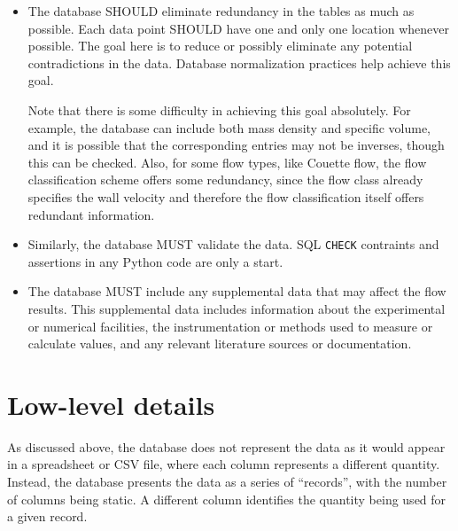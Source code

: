 \begin{itemize}
\begin{enumerate}
    \end{enumerate}

\item The database SHOULD eliminate redundancy in the tables as much as
possible.  Each data point SHOULD have one and only one location whenever
possible.  The goal here is to reduce or possibly eliminate any potential
contradictions in the data.  Database normalization practices help achieve this
goal.

Note that there is some difficulty in achieving this goal absolutely.  For
example, the database can include both mass density and specific volume, and it
is possible that the corresponding entries may not be inverses, though this can
be checked.  Also, for some flow types, like Couette flow, the flow
classification scheme offers some redundancy, since the flow class already
specifies the wall velocity and therefore the flow classification itself offers
redundant information.

\item Similarly, the database MUST validate the data.  SQL \texttt{CHECK}
contraints and assertions in any Python code are only a start.

\item The database MUST include any supplemental data that may affect the flow
results.  This supplemental data includes information about the experimental or
numerical facilities, the instrumentation or methods used to measure or
calculate values, and any relevant literature sources or documentation.

\end{itemize}


\section{Low-level details}

As discussed above, the database does not represent the data as it would appear
in a spreadsheet or CSV file, where each column represents a different
quantity.  Instead, the database presents the data as a series of ``records'',
with the number of columns being static.  A different column identifies the
quantity being used for a given record.

